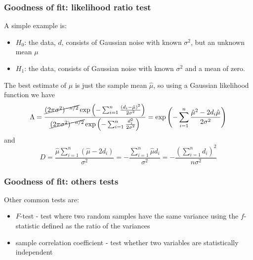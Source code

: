 \begin{frame}

\frametitle{Goodness of fit: likelihood ratio test}
\label{goodnessoffit:likelihoodratiotest}

A simple example is:

\begin{itemize}
\item $H_0$: the data, $d$, consists of Gaussian noise with known $\sigma^2$, but an unknown mean $\mu$

\item $H_1$: the data, consists of Gaussian noise with known $\sigma^2$ and a mean of zero.

\end{itemize}

The best estimate of $\mu$ is just the sample mean $\hat{\mu}$, so using a Gaussian likelihood function we have
\[
\Lambda = \frac{ \cancel{(2\pi \sigma^2)^{-n/2}} \exp{\left(-\sum_{i=1}^n \frac{(d_i-\hat{\mu})^2}{2\sigma^2} \right)} }{ \cancel{(2\pi \sigma^2)^{-n/2}} \exp{\left(-\sum_{i=1}^n \frac{d_i^2}{2\sigma^2} \right)} } =
\exp{\left( -\sum_{i=1}^n \frac{\hat{\mu}^2 - 2d_i\hat{\mu}}{2\sigma^2} \right)}
\]
and
\[
D = \frac{\hat{\mu}\sum_{i=1}^n (\hat{\mu} - 2 d_i)}{\sigma^2} = -\frac{\sum_{i=1}^n \hat{\mu} d_i}{\sigma^2} = -\frac{\left(\sum_{i=1}^n d_i\right)^2}{n\sigma^2}
\]

\end{frame}

\begin{frame}

\frametitle{Goodness of fit: others tests}
\label{goodnessoffit:otherstests}

Other common tests are:

\begin{itemize}
\item $F$-test - test where two random samples have the same variance using the $f$-statistic defined
as the ratio of the variances

\item sample correlation coefficient - test whether two variables are statistically independent

\end{itemize}

\end{frame}

